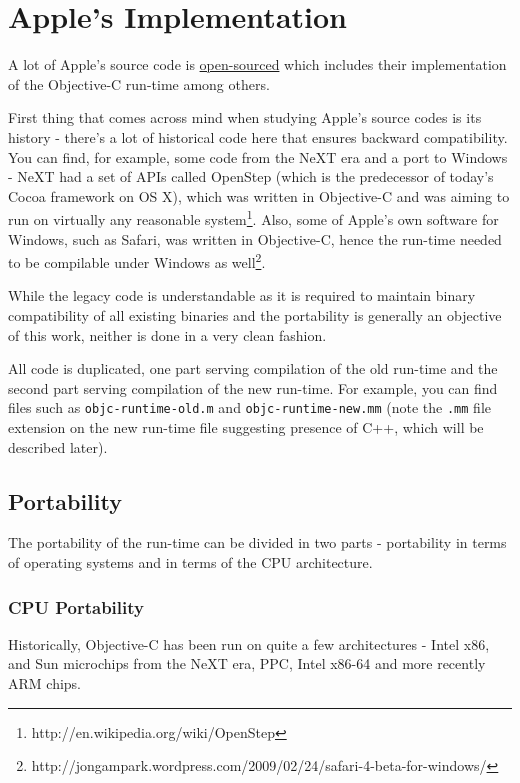 \chapter{Apple's Implementation}

A lot of Apple's source code is \href{''http://www.opensource.apple.com''}{open-sourced} which includes their implementation of the Objective-C run-time among others.

First thing that comes across mind when studying Apple's source codes is its history - there's a lot of historical code here that ensures backward compatibility. You can find, for example, some code from the NeXT era and a port to Windows - NeXT had a set of APIs called OpenStep (which is the predecessor of today's Cocoa framework on OS X), which was written in Objective-C and was aiming to run on virtually any reasonable system\footnote{http://en.wikipedia.org/wiki/OpenStep}. Also, some of Apple's own software for Windows, such as Safari, was written in Objective-C, hence the run-time needed to be compilable under Windows as well\footnote{http://jongampark.wordpress.com/2009/02/24/safari-4-beta-for-windows/}.

While the legacy code is understandable as it is required to maintain binary compatibility of all existing binaries and the portability is generally an objective of this work, neither is done in a very clean fashion.

All code is duplicated, one part serving compilation of the old run-time and the second part serving compilation of the new run-time. For example, you can find files such as \verb=objc-runtime-old.m= and \verb=objc-runtime-new.mm= (note the \verb=.mm= file extension on the new run-time file suggesting presence of C++, which will be described later).

\section{Portability}

The portability of the run-time can be divided in two parts - portability in terms of operating systems and in terms of the CPU architecture.

\subsection{CPU Portability}

Historically, Objective-C has been run on quite a few architectures - Intel x86, and Sun microchips from the NeXT era, PPC, Intel x86-64 and more recently ARM chips.

